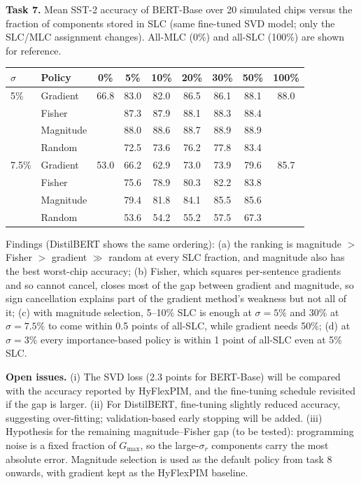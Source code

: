 \documentclass[10pt,a4paper]{article}
\begin{document}
\noindent\textbf{Task 7.} Mean SST-2 accuracy of BERT-Base over 20 simulated chips versus the fraction of
components stored in SLC (same fine-tuned SVD model; only the SLC/MLC assignment changes).
All-MLC (0\%) and all-SLC (100\%) are shown for reference.

\begin{table}[h]
\centering\small
\begin{tabular}{@{}llccccccc@{}}
\toprule
$\sigma$ & Policy & 0\% & 5\% & 10\% & 20\% & 30\% & 50\% & 100\% \\
\midrule
5\%   & Gradient  & 66.8 & 83.0 & 82.0 & 86.5 & 86.1 & 88.1 & 88.0 \\
      & Fisher    &      & 87.3 & 87.9 & 88.1 & 88.3 & 88.4 & \\
      & Magnitude &      & 88.0 & 88.6 & 88.7 & 88.9 & 88.9 & \\
      & Random    &      & 72.5 & 73.6 & 76.2 & 77.8 & 83.4 & \\
\midrule
7.5\% & Gradient  & 53.0 & 66.2 & 62.9 & 73.0 & 73.9 & 79.6 & 85.7 \\
      & Fisher    &      & 75.6 & 78.9 & 80.3 & 82.2 & 83.8 & \\
      & Magnitude &      & 79.4 & 81.8 & 84.1 & 85.5 & 85.6 & \\
      & Random    &      & 53.6 & 54.2 & 55.2 & 57.5 & 67.3 & \\
\bottomrule
\end{tabular}
\end{table}

\noindent Findings (DistilBERT shows the same ordering): (a) the ranking is
magnitude $>$ Fisher $>$ gradient $\gg$ random at every SLC fraction, and magnitude also has the best
worst-chip accuracy; (b) Fisher, which squares per-sentence gradients and so cannot cancel, closes most
of the gap between gradient and magnitude, so sign cancellation explains part of the gradient method's
weakness but not all of it; (c) with magnitude selection, 5--10\% SLC is enough at $\sigma=5\%$ and
30\% at $\sigma=7.5\%$ to come within 0.5 points of all-SLC, while gradient needs 50\%; (d) at
$\sigma=3\%$ every importance-based policy is within 1 point of all-SLC even at 5\% SLC.

\noindent\textbf{Open issues.} (i) The SVD loss (2.3 points for BERT-Base) will be compared with the
accuracy reported by HyFlexPIM, and the fine-tuning schedule revisited if the gap is larger. (ii) For
DistilBERT, fine-tuning slightly reduced accuracy, suggesting over-fitting; validation-based early
stopping will be added. (iii) Hypothesis for the remaining magnitude--Fisher gap (to be tested):
programming noise is a fixed fraction of $G_{\max}$, so the large-$\sigma_r$ components carry the most
absolute error. Magnitude selection is used as the default policy from task 8 onwards, with gradient
kept as the HyFlexPIM baseline.
\end{document}
